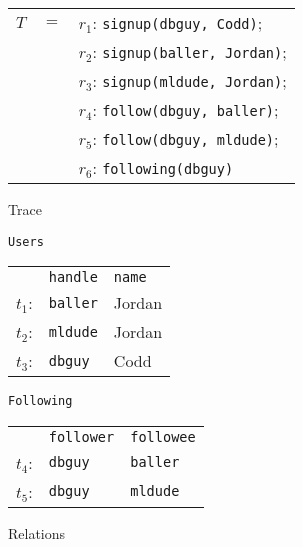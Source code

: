 \begin{figure*}[ht]
  \centering
  \begin{subfigure}[c]{0.3\textwidth}
    \small
    \centering
    \begin{tabular}{rcl}
      $T$  & $=$ & $r_1$: \texttt{signup(dbguy, Codd)}; \\
           &     & $r_2$: \texttt{signup(baller, Jordan)}; \\
           &     & $r_3$: \texttt{signup(mldude, Jordan)}; \\
           &     & $r_4$: \texttt{follow(dbguy, baller)}; \\
           &     & $r_5$: \texttt{follow(dbguy, mldude)}; \\
           &     & $r_6$: \texttt{following(dbguy)} \\
    \end{tabular}
    \caption{Trace}
  \end{subfigure}%
  \begin{subfigure}[c]{0.2\textwidth}
    \centering
    \small

    \texttt{Users} \\
    \begin{tabular}{l|l|l|}
      \cline{2-3}
             & \texttt{handle} & \texttt{name} \\\cline{2-3}
      $t_1$: & \texttt{baller} & Jordan \\
      $t_2$: & \texttt{mldude} & Jordan \\
      $t_3$: & \texttt{dbguy}  & Codd \\\cline{2-3}
    \end{tabular}

    \vspace{3mm}

    \texttt{Following} \\
    \begin{tabular}{l|l|l|}
      \cline{2-3}
             & \texttt{follower} & \texttt{followee} \\\cline{2-3}
      $t_4$: & \texttt{dbguy}    & \texttt{baller} \\
      $t_5$: & \texttt{dbguy}    & \texttt{mldude} \\\cline{2-3}
    \end{tabular}
    \caption{Relations}
  \end{subfigure}%
  \begin{subfigure}[c]{0.5\textwidth}
    \small
    \centering


\end{subfigure}
\end{figure*}
